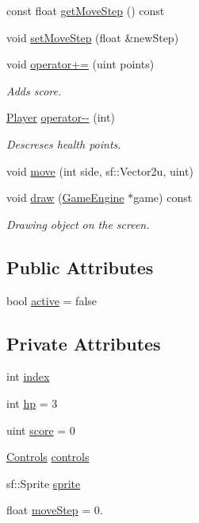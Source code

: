 \begin{DoxyCompactItemize}
\item 
const float \mbox{\hyperlink{class_player_afb255210e4ca1d463c18b4a5aa26a1e0}{get\+Move\+Step}} () const
\item 
void \mbox{\hyperlink{class_player_a658ca673f68b8ba14f888b313f2f8fd3}{set\+Move\+Step}} (float \&new\+Step)
\item 
void \mbox{\hyperlink{class_player_a234802f1731a329b697fde399a20d0ad}{operator+=}} (uint points)
\begin{DoxyCompactList}\small\item\em Adds score. \end{DoxyCompactList}\item 
\mbox{\hyperlink{class_player}{Player}} \mbox{\hyperlink{class_player_ac56de355f4f7079ddc994ea16f05cda2}{operator-\/-\/}} (int)
\begin{DoxyCompactList}\small\item\em Descreses health points. \end{DoxyCompactList}\item 
void \mbox{\hyperlink{class_player_aef0d42bebee03ea367cc38d07d614536}{move}} (int side, sf\+::\+Vector2u, uint)
\item 
void \mbox{\hyperlink{class_player_aaa0642fde01a4db5e9ee95693805ecda}{draw}} (\mbox{\hyperlink{class_game_engine}{Game\+Engine}} $\ast$game) const
\begin{DoxyCompactList}\small\item\em Drawing object on the screen. \end{DoxyCompactList}\end{DoxyCompactItemize}
\subsection*{Public Attributes}
\begin{DoxyCompactItemize}
\item 
bool \mbox{\hyperlink{class_player_a983d905fd90661bd69b40d8a1259e156}{active}} = false
\end{DoxyCompactItemize}
\subsection*{Private Attributes}
\begin{DoxyCompactItemize}
\item 
int \mbox{\hyperlink{class_player_a1d1f9fee5f774351292af1d0cfa7d65c}{index}}
\item 
int \mbox{\hyperlink{class_player_a2baad6b9a274417a7374baf11d5f723d}{hp}} = 3
\item 
uint \mbox{\hyperlink{class_player_ab8b3c0ffbde70b09f2ad4d230478f33b}{score}} = 0
\item 
\mbox{\hyperlink{struct_controls}{Controls}} \mbox{\hyperlink{class_player_a13625a09fdc72185e82ff5f6894049af}{controls}}
\item 
sf\+::\+Sprite \mbox{\hyperlink{class_player_a19bc8731e5e84613a2ae7c4b5134dfab}{sprite}}
\item 
float \mbox{\hyperlink{class_player_aca3b0c23e14b372078c31cdb7906032c}{move\+Step}} = 0.
\end{DoxyCompactItemize}


